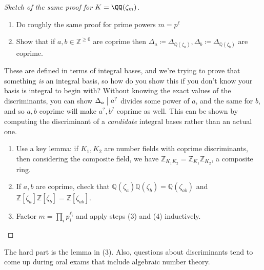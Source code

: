 \begin{proof}[Sketch of the same proof for $K = \QQ(\zeta_m)$]

\envlist

\begin{enumerate}
\def\labelenumi{\arabic{enumi}.}
\item
  Do roughly the same proof for prime powers \(m = p^\ell\)
\item
  Show that if \(a, b\in {\mathbb{Z}}^{\geq 0}\) are coprime then
  \({\Delta}_a \coloneqq{\Delta}_{{\mathbb{Q}}( \zeta_a)}, {\Delta}_b \coloneqq{\Delta}_{{\mathbb{Q}}(\zeta_b)}\)
  are coprime.
\end{enumerate}

These are defined in terms of integral bases, and we're trying to prove
that something \emph{is} an integral basis, so how do you show this if
you don't know your basis is integral to begin with? Without knowing the
exact values of the discriminants, you can show \({\Delta}_a \bigm|a^?\)
divides some power of \(a\), and the same for \(b\), and so \(a, b\)
coprime will make \(a^?, b^?\) coprime as well. This can be shown by
computing the discriminant of a \emph{candidate} integral bases rather
than an actual one.

\begin{enumerate}
\def\labelenumi{\arabic{enumi}.}
\setcounter{enumi}{2}
\item
  Use a key lemma: if \(K_1, K_2\) are number fields with coprime
  discriminants, then considering the composite field, we have
  \({\mathbb{Z}}_{K_1 K_2} = {\mathbb{Z}}_{K_1} {\mathbb{Z}}_{K_2}\), a
  composite ring.
\item
  If \(a, b\) are coprime, check that
  \({\mathbb{Q}}(\zeta_a) {\mathbb{Q}}(\zeta_b) = {\mathbb{Q}}(\zeta_{ab})\)
  and
  \({\mathbb{Z}}[ \zeta_a] {\mathbb{Z}}[ \zeta_b] = {\mathbb{Z}}[ \zeta_{ab} ]\).
\item
  Factor \(m = \prod_{i} p_i^{\ell_i}\) and apply steps (3) and (4)
  inductively.
\end{enumerate}

\end{proof}

\begin{remark}

The hard part is the lemma in (3). Also, questions about discriminants
tend to come up during oral exams that include algebraic number theory.

\end{remark}

